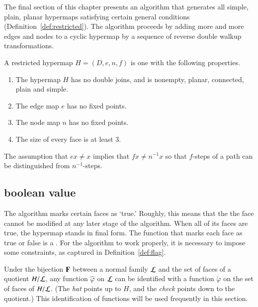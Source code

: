 The final section of this chapter presents an algorithm that generates all
simple, plain, planar hypermaps satisfying certain general conditions
(Definition~\ref{def:restricted}).  The algorithm proceeds by adding more and
more
edges and nodes to a cyclic hypermap by a sequence of reverse double walkup
transformations.

\begin{definition}[restricted]\label{def:restricted}
A restricted hypermap $H = (D,e,n,f)$ is one with the following
properties.
\begin{enumerate}
\item The hypermap $H$ has no double joins, and is nonempty, planar,
  connected, plain and simple.
\item The edge map $e$ has no fixed points.  %
\item The node map $n$ has no fixed points.
\item The size of every face is at least $3$.
\end{enumerate}
%
%
\end{definition}

\begin{remark}
The assumption that $e x \ne x$ implies that $f x \ne n^{-1} x$ so that $f$-steps of a 
path can be distinguished from $n^{-1}$-steps.
\end{remark}


\subsection{boolean value}
%

The algorithm  marks certain faces as `true.'
Roughly, this  means that the the face cannot be modified
at any later stage of the algorithm.   When all of its faces
are true, the hypermap stands in final form.
The function that marks each face as true or false is a
.  For the algorithm to work properly, it is necessary
to impose some constraints, as captured in Definition~\ref{def:flag}.
%


Under the bijection ${\mathbf F}$ between a normal family ${\cal L}$ and the set of
faces of a quotient $H/{\cal L}$, any function $\hat\varphi$ on ${\cal L}$
can be identified with a function $\check\varphi$ on the set of faces of $H/{\cal L}$.
(The {\it hat} points up to $H$, and the {\it check} points down to the quotient.)
This identification of functions will be used frequently in this section.

